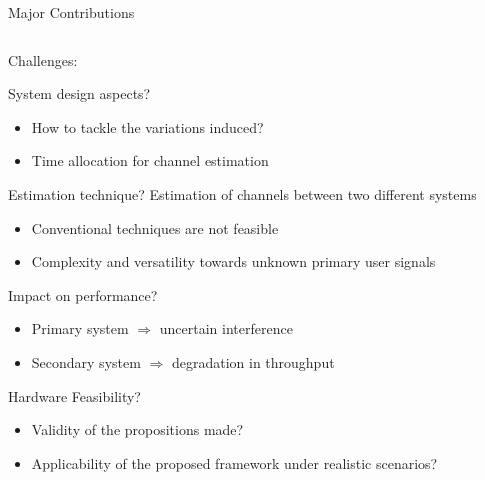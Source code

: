 \documentclass[16pt]{beamer}
\newcommand{\fs}[2]{\fontsize{#1 pt}{#2}\selectfont}
\begin{document}
\begin{frame}[t]{Major Contributions}
	\vspace{-1.5mm}
	\begin{columns}
		\begin{column}[t]{0.53\columnwidth}
			\centering Challenges: \\[-0.2em]
				\fs{7}{8}
				\begin{block}{\scriptsize System design aspects?} %
					\begin{itemize} 
						\item How to tackle the variations induced? 
						\item Time allocation for channel estimation 
					\end{itemize}
				\end{block}
				\vspace{-1.1mm}
				{
				\begin{block}{\scriptsize Estimation technique?} %
					Estimation of channels between two different systems %
					\begin{itemize}
						\item Conventional techniques are not feasible  
						\item Complexity and versatility towards unknown primary user signals
					\end{itemize}
				\end{block}
				}
				\vspace{-1.1mm}
				{
				\begin{block}{\scriptsize Impact on performance?}%
					\begin{itemize}
						\item Primary system $\Rightarrow$ uncertain interference 
						\item Secondary system $\Rightarrow$ degradation in throughput 
					\end{itemize} 
				\end{block}
				}	
				\vspace{-1.1mm}
				{
				\begin{block}{\scriptsize Hardware Feasibility?}%
					\begin{itemize}
					\item Validity of the propositions made? 
					\item Applicability of the proposed framework under realistic scenarios? 
					\end{itemize}	
				\end{block}
				}
		\end{column}
		

\end{columns}
\end{frame}
\end{document}
